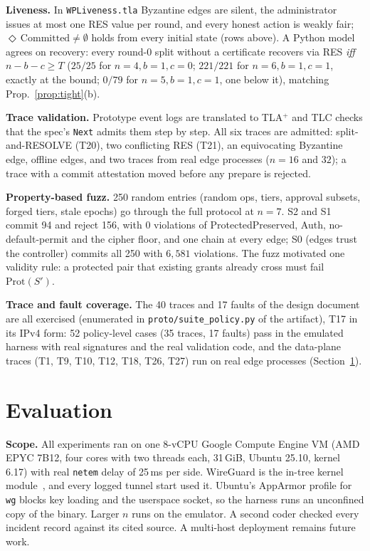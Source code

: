 \documentclass[conference]{IEEEtran}
\begin{document}
\textbf{Liveness.} In \texttt{WPLiveness.tla} Byzantine edges are silent, the administrator issues at most one RES value per round, and every honest action is weakly fair; $\Diamond\,\mathrm{Committed}\ne\emptyset$ holds from every initial state (rows above). A Python model agrees on recovery: every round-0 split without a certificate recovers via RES \emph{iff} $n-b-c\ge T$ ($25/25$ for $n{=}4,b{=}1,c{=}0$; $221/221$ for $n{=}6,b{=}1,c{=}1$, exactly at the bound; $0/79$ for $n{=}5,b{=}1,c{=}1$, one below it), matching Prop.~\ref{prop:tight}(b).

\textbf{Trace validation.} Prototype event logs are translated to TLA$^+$ and TLC checks that the spec's \texttt{Next} admits them step by step. All six traces are admitted: split-and-RESOLVE (T20), two conflicting RES (T21), an equivocating Byzantine edge, offline edges, and two traces from real edge processes ($n{=}16$ and $32$); a trace with a commit attestation moved before any prepare is rejected.

\textbf{Property-based fuzz.} 250 random entries (random ops, tiers, approval subsets, forged tiers, stale epochs) go through the full protocol at $n{=}7$. S2 and S1 commit 94 and reject 156, with $0$ violations of ProtectedPreserved, Auth, no-default-permit and the cipher floor, and one chain at every edge; S0 (edges trust the controller) commits all 250 with $6{,}581$ violations. The fuzz motivated one validity rule: a protected pair that existing grants already cross must fail $\mathrm{Prot}(S')$.

\textbf{Trace and fault coverage.} The 40 traces and 17 faults of the design document are all exercised (enumerated in \texttt{proto/suite\_policy.py} of the artifact), T17 in its IPv4 form: 52 policy-level cases (35 traces, 17 faults) pass in the emulated harness with real signatures and the real validation code, and the data-plane traces (T1, T9, T10, T12, T18, T26, T27) run on real edge processes (Section~\ref{sec:eval}).

\section{Evaluation}\label{sec:eval}
\textbf{Scope.} All experiments ran on one 8-vCPU Google Compute Engine VM (AMD EPYC 7B12, four cores with two threads each, 31\,GiB, Ubuntu 25.10, kernel 6.17) with real \texttt{netem} delay of 25\,ms per side. WireGuard is the in-tree kernel module~\cite{wireguard}, and every logged tunnel start used it. Ubuntu's AppArmor profile for \texttt{wg} blocks key loading and the userspace socket, so the harness runs an unconfined copy of the binary. Larger $n$ runs on the emulator. A second coder checked every incident record against its cited source. A multi-host deployment remains future work.
\end{document}
